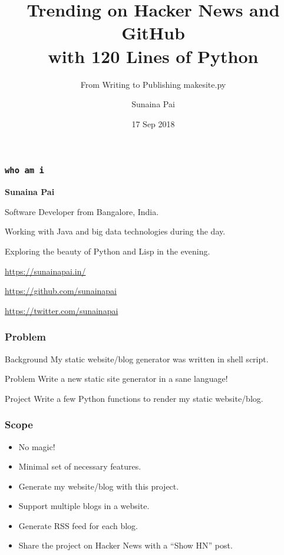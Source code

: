 \documentclass{beamer}
\title{Trending on Hacker News and GitHub \\ with 120 Lines of Python}
\subtitle{\vspace{2mm} From Writing to Publishing makesite.py}
\author{Sunaina Pai}
\institute[PyCon UK 2018, Cardiff, UK]{
    PyCon UK 2018, Cardiff City Hall, Cardiff, UK
}
\date{17 Sep 2018}
\begin{document}
\frame{\titlepage}

\begin{frame}
    \frametitle{\texttt{who am i}}

    \textbf{Sunaina Pai}

    \bigskip

    Software Developer from Bangalore, India.

    Working with Java and big data technologies during the day.

    Exploring the beauty of Python and Lisp in the evening.

    \bigskip

    \faLink{}
    \url{https://sunainapai.in/}

    \faGithub{}
    \url{https://github.com/sunainapai}

    \faTwitter{}
    \url{https://twitter.com/sunainapai}
\end{frame}


\begin{frame}
    \frametitle{Problem}
    \begin{block}{Background}
    My static website/blog generator was written in shell script.
    \end{block}

    \bigskip

    \begin{block}{Problem}
    Write a new static site generator in a sane language!
    \end{block}

    \bigskip

    \begin{block}{Project}
    Write a few Python functions to render my static website/blog.
    \end{block}
\end{frame}


\begin{frame}
    \frametitle{Scope}
    \begin{itemize}
        \item No magic!
        \item Minimal set of necessary features.
        \item Generate my website/blog with this project.
        \item Support multiple blogs in a website.
        \item Generate RSS feed for each blog.
        \item Share the project on Hacker News with a ``Show HN'' post.
    \end{itemize}
\end{frame}
\end{document}

